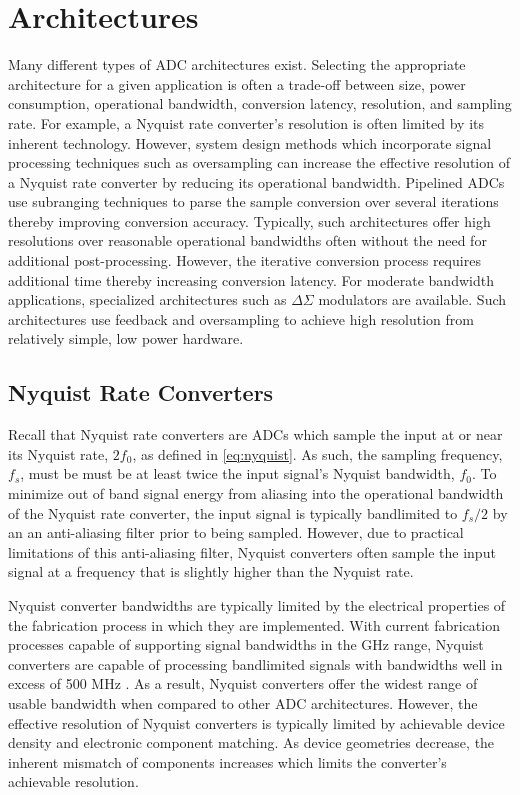 \section{Architectures}
Many different types of ADC architectures exist. Selecting the appropriate
architecture for a given application is often a trade-off between size, power
consumption, operational bandwidth, conversion latency, resolution, and sampling rate.
For example, a Nyquist rate converter's resolution is often limited by
its inherent technology. However, system design methods which incorporate signal
processing techniques such as oversampling can increase the effective resolution
of a Nyquist rate converter by reducing its operational bandwidth. Pipelined ADCs use
subranging techniques to parse the sample conversion over several iterations thereby
improving conversion accuracy. Typically, such architectures offer high resolutions over
reasonable operational bandwidths often without the need for additional
post-processing. However, the iterative conversion process requires additional time
thereby increasing conversion latency. For moderate bandwidth applications, specialized
architectures such as $\Delta\Sigma$ modulators are available. Such architectures use
feedback and oversampling to achieve high resolution from relatively simple, low  power 
hardware. 

\subsection{Nyquist Rate Converters}
Recall that Nyquist rate converters are ADCs which sample the input at or near its
Nyquist rate, $2f_0$, as defined in \eqref{eq:nyquist}. As such, the sampling frequency,
$f_s$, must be must be at least twice the input signal's Nyquist bandwidth, $f_0$. To
minimize out of band signal energy from aliasing into the operational bandwidth of the
Nyquist rate converter, the input signal is typically bandlimited to $f_s/2$ by an an
anti-aliasing filter prior to being sampled. However, due to practical limitations of this
anti-aliasing filter, Nyquist converters often sample the input signal at a frequency that
is slightly higher than the Nyquist rate.

Nyquist converter bandwidths are typically limited by the electrical properties of
the fabrication process in which they are implemented. With current fabrication processes
capable of supporting signal bandwidths in the GHz range, Nyquist converters are capable
of processing bandlimited signals with bandwidths well in excess of 500 MHz
\cite{ltc2209_datasheet}.
As a result, Nyquist converters offer the widest range of usable bandwidth when compared
to other ADC architectures. However, the effective resolution of Nyquist converters is
typically limited by achievable device density and electronic component matching. As
device geometries decrease, the inherent mismatch of components increases which limits the
converter's achievable resolution.

